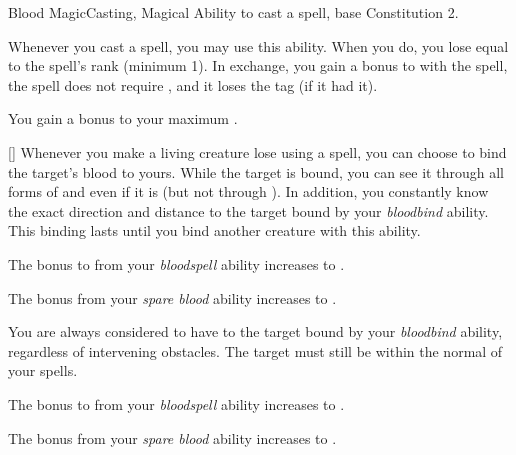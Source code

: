     \begin{feat}{Blood Magic}{Casting, Magical}
        \featpre Ability to cast a spell, base Constitution 2.

         Whenever you cast a spell, you may use this ability.
        When you do, you lose  equal to the spell's rank (minimum 1).
        In exchange, you gain a  bonus to  with the spell, the spell does not require , and it loses the  tag (if it had it).

         You gain a  bonus to your maximum .

        [] Whenever you make a living creature lose  using a spell, you can choose to bind the target's blood to yours.
        While the target is bound, you can see it through all forms of  and even if it is  (but not through ).
        In addition, you constantly know the exact direction and distance to the target bound by your \textit{bloodbind} ability.
        This binding lasts until you bind another creature with this ability.

         The bonus to  from your \textit{bloodspell} ability increases to .

         The bonus from your \textit{spare blood} ability increases to .

         You are always considered to have  to the target bound by your \textit{bloodbind} ability, regardless of intervening obstacles.
        The target must still be within the normal  of your spells.

         The bonus to  from your \textit{bloodspell} ability increases to .

         The bonus from your \textit{spare blood} ability increases to .
    \end{feat}

